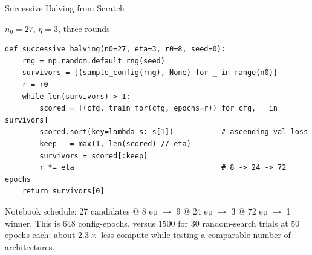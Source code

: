\documentclass[aspectratio=169,11pt]{beamer}
\begin{document}
\begin{frame}[fragile]{Successive Halving from Scratch}
\begin{block}{$n_0=27$, $\eta=3$, three rounds}
{\scriptsize
\begin{verbatim}
def successive_halving(n0=27, eta=3, r0=8, seed=0):
    rng = np.random.default_rng(seed)
    survivors = [(sample_config(rng), None) for _ in range(n0)]
    r = r0
    while len(survivors) > 1:
        scored = [(cfg, train_for(cfg, epochs=r)) for cfg, _ in survivors]
        scored.sort(key=lambda s: s[1])           # ascending val loss
        keep   = max(1, len(scored) // eta)
        survivors = scored[:keep]
        r *= eta                                  # 8 -> 24 -> 72 epochs
    return survivors[0]
\end{verbatim}
}
\end{block}
{\scriptsize Notebook schedule: 27 candidates @ 8 ep $\to$ 9 @ 24 ep $\to$ 3 @ 72 ep $\to$ 1 winner.  This is $648$ config-epochs, versus $1500$ for $30$ random-search trials at $50$ epochs each: about $2.3\times$ less compute while testing a comparable number of architectures.}
\end{frame}
\end{document}
